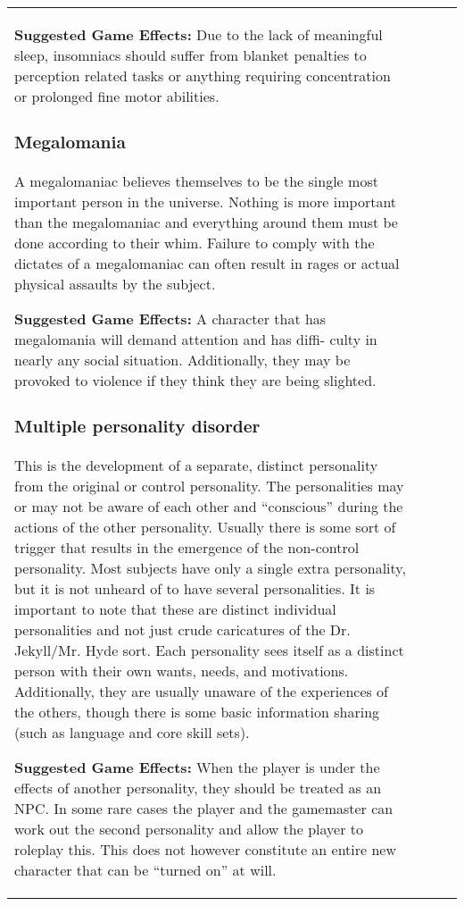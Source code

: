 \begin{table}
\begin{tabular}{|p{8cm}|r|r|r|}
\textbf{Suggested Game Effects: }Due to the lack of meaningful sleep, insomniacs should suffer from blanket penalties to perception related tasks or anything requiring concentration or prolonged fine motor abilities. 

\subsubsection{Megalomania} 

A megalomaniac believes themselves to be the single most important person in the universe. Nothing is more important than the megalomaniac and everything around them must be done according to their whim. Failure to comply with the dictates of a megalomaniac can often result in rages or actual physical assaults by the subject. 

\textbf{Suggested Game Effects:} A character that has megalomania will demand attention and has diffi- culty in nearly any social situation. Additionally, they may be provoked to violence if they think they are being slighted. 

\subsubsection{Multiple personality disorder} 

This is the development of a separate, distinct personality from the original or control personality. The personalities may or may not be aware of each other and ``conscious” during the actions of the other personality. Usually there is some sort of trigger that results in the emergence of the non-control personality. Most subjects have only a single extra personality, but it is not unheard of to have several personalities. It is important to note that these are distinct individual personalities and not just crude caricatures of the Dr. Jekyll/Mr. Hyde sort. Each personality sees itself as a distinct person with their own wants, needs, and motivations. Additionally, they are usually unaware of the experiences of the others, though there is some basic information sharing (such as language and core skill sets). 

\textbf{Suggested Game Effects:} When the player is under the effects of another personality, they should be treated as an NPC. In some rare cases the player and the gamemaster can work out the second personality and allow the player to roleplay this. This does not however constitute an entire new character that can be ``turned on” at will. 


\end{tabular}
\end{table}
